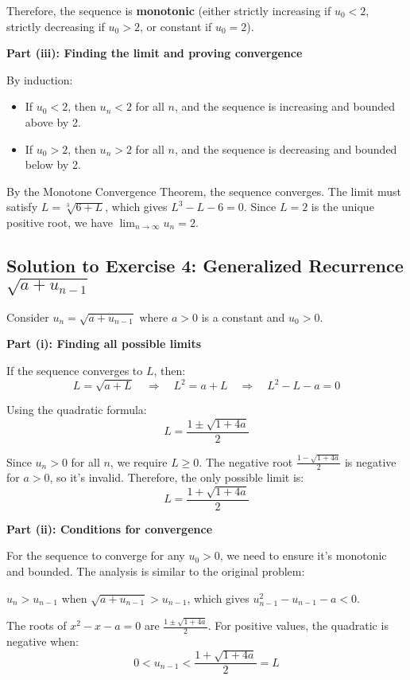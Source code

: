 \documentclass[12pt,a4paper]{article}
\theoremstyle{definition}
\begin{document}
Therefore, the sequence is \textbf{monotonic} (either strictly increasing if $u_0 < 2$, strictly decreasing if $u_0 > 2$, or constant if $u_0 = 2$).

\textbf{Part (iii): Finding the limit and proving convergence}

By induction:
\begin{itemize}
    \item If $u_0 < 2$, then $u_n < 2$ for all $n$, and the sequence is increasing and bounded above by 2.
    \item If $u_0 > 2$, then $u_n > 2$ for all $n$, and the sequence is decreasing and bounded below by 2.
\end{itemize}

By the Monotone Convergence Theorem, the sequence converges. The limit must satisfy $L = \sqrt[3]{6 + L}$, which gives $L^3 - L - 6 = 0$. Since $L = 2$ is the unique positive root, we have $\lim_{n \to \infty} u_n = 2$.

\subsection{Solution to Exercise 4: Generalized Recurrence $\sqrt{a + u_{n-1}}$}

Consider $u_n = \sqrt{a + u_{n-1}}$ where $a > 0$ is a constant and $u_0 > 0$.

\textbf{Part (i): Finding all possible limits}

If the sequence converges to $L$, then:
\[
L = \sqrt{a + L} \quad \Rightarrow \quad L^2 = a + L \quad \Rightarrow \quad L^2 - L - a = 0
\]

Using the quadratic formula:
\[
L = \frac{1 \pm \sqrt{1 + 4a}}{2}
\]

Since $u_n > 0$ for all $n$, we require $L \geq 0$. The negative root $\frac{1 - \sqrt{1 + 4a}}{2}$ is negative for $a > 0$, so it's invalid. Therefore, the only possible limit is:
\[
L = \frac{1 + \sqrt{1 + 4a}}{2}
\]

\textbf{Part (ii): Conditions for convergence}

For the sequence to converge for any $u_0 > 0$, we need to ensure it's monotonic and bounded. The analysis is similar to the original problem:

$u_n > u_{n-1}$ when $\sqrt{a + u_{n-1}} > u_{n-1}$, which gives $u_{n-1}^2 - u_{n-1} - a < 0$.

The roots of $x^2 - x - a = 0$ are $\frac{1 \pm \sqrt{1 + 4a}}{2}$. For positive values, the quadratic is negative when:
\[
0 < u_{n-1} < \frac{1 + \sqrt{1 + 4a}}{2} = L
\]
\end{document}
